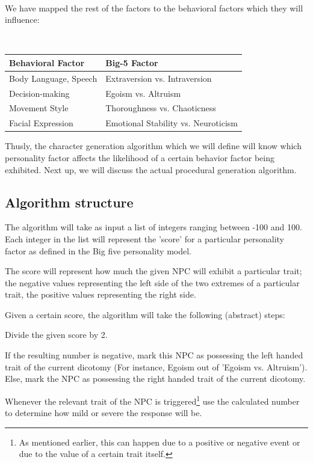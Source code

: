 \documentclass{article}
\begin{document}
    ~\\
    We have mapped the rest of the factors to the behavioral factors which they will influence:

    ~\\
	\centering
	\label{my-label}
		\begin{tabular}{| p{4cm} | p{4cm} |}
		 \textbf{Behavioral Factor} & \textbf{Big-5 Factor}   \\  \hline
		 Body Language, Speech & Extraversion vs. Intraversion \\  \hline
		 Decision-making & Egoism vs. Altruism    \\  \hline
		 Movement Style & Thoroughness vs. Chaoticness    \\  \hline
 		 Facial Expression & Emotional Stability vs. Neuroticism    
		\end{tabular}
	
	Thusly, the character generation algorithm which we will define will know which personality factor affects the likelihood of a certain behavior factor being exhibited. Next up, we will discuss the actual procedural generation algorithm.

  \newpage
  \subsection{Algorithm structure}
   The algorithm will take as input a list of integers ranging between -100 and 100. Each integer in the list will represent the 'score' for a particular 
   personality factor as defined in the Big five personality model. 

   The score will represent how much the given NPC will exhibit a particular trait; the negative values representing the left side of the two extremes of a particular trait, the positive values representing the right side.

   Given a certain score, the algorithm will take the following (abstract) steps:

   \begin{enum}
   \item Divide the given score by 2. 
   \item If the resulting number is negative, mark this NPC as possessing the left handed trait of the current dicotomy (For instance, Egoism out of 'Egoism vs. Altruism'). Else, mark the NPC as possessing the right handed trait of the current dicotomy.
   \item Whenever the relevant trait of the NPC is triggered\footnote{As mentioned earlier, this can happen due to a positive or negative event or due to the value of a certain trait itself.} use the calculated number to determine how mild or severe the response will be.
   \end{enum}
\end{document}
